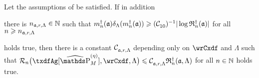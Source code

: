 \begin{cor}\label{ge:ak:ag:ub2:pnp:mm}
  Let the assumptions of  be satisfied.  If in
  addition
  \begin{inparaenum}\item[\mylabel{ge:ak:ag:ub2:pnp:mm:c}{{\dgrau\bfseries(A)}}]
    there is $\ssY_{\xdfCw[],\xdfCr,\Lambda}\in\Nz$  such that
    $\aDi{\ssY}({\xdfCw[]})\cmSv[\aDi{\ssY}({\xdfCw[]})]\geq(\cst{10})^{-1} \vert \log\naRa{(\xdfCw[])} \vert $
    for all $\ssY\geq \ssY_{\xdfCw[],\xdfCr,\Lambda}$
  \end{inparaenum}
  holds true, then there is a constant $\cst{\xdfCw[],\xdfCr,\Lambda}$
  depending only on $\rwCxdf$ and $\Lambda$ such that
  $ \nRi{\txdfAg[{\erWe[]}]}{\rwCxdf,\Lambda} \leq
  \cst{\xdfCw[],\xdfCr,\Lambda}\naRa{(\xdfCw[],\Lambda)}$ for all $n\in\Nz$
  holds true.
\end{cor}

